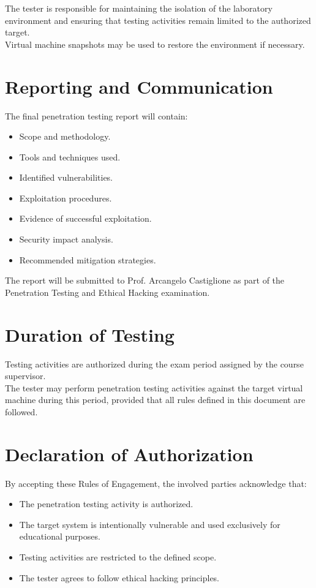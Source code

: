 The tester is responsible for maintaining the isolation of the laboratory
environment and ensuring that testing activities remain limited to the
authorized target.
\\

Virtual machine snapshots may be used to restore the environment if necessary.


\section{Reporting and Communication}

The final penetration testing report will contain:

\begin{itemize}
    \item Scope and methodology.
    \item Tools and techniques used.
    \item Identified vulnerabilities.
    \item Exploitation procedures.
    \item Evidence of successful exploitation.
    \item Security impact analysis.
    \item Recommended mitigation strategies.
\end{itemize}

The report will be submitted to Prof. Arcangelo Castiglione as part of the
Penetration Testing and Ethical Hacking examination.


\section{Duration of Testing}

Testing activities are authorized during the exam period assigned by the
course supervisor.
\\

The tester may perform penetration testing activities against the target
virtual machine during this period, provided that all rules defined in this
document are followed.


\section{Declaration of Authorization}

By accepting these Rules of Engagement, the involved parties
acknowledge that:

\begin{itemize}
    \item The penetration testing activity is authorized.
    \item The target system is intentionally vulnerable and used exclusively
    for educational purposes.
    \item Testing activities are restricted to the defined scope.
    \item The tester agrees to follow ethical hacking principles.
\end{itemize}